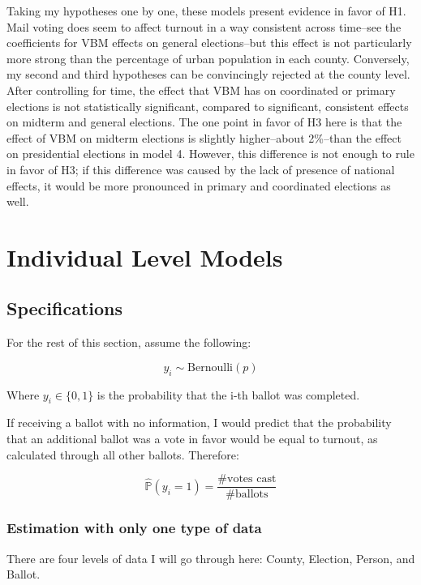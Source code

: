 \documentclass[12pt,twoside]{reedthesis}
\begin{document}
  Taking my hypotheses one by one, these models present evidence in favor
  of H1. Mail voting does seem to affect turnout in a way consistent
  across time--see the coefficients for VBM effects on general
  elections--but this effect is not particularly more strong than the
  percentage of urban population in each county. Conversely, my second and
  third hypotheses can be convincingly rejected at the county level. After
  controlling for time, the effect that VBM has on coordinated or primary
  elections is not statistically significant, compared to significant,
  consistent effects on midterm and general elections. The one point in
  favor of H3 here is that the effect of VBM on midterm elections is
  slightly higher--about 2\%--than the effect on presidential elections in
  model 4. However, this difference is not enough to rule in favor of H3;
  if this difference was caused by the lack of presence of national
  effects, it would be more pronounced in primary and coordinated
  elections as well.
  
  \section{Individual Level Models}\label{individual-level-models}
  
  \subsection{Specifications}\label{specifications-1}
  
  For the rest of this section, assume the following:
  
  \[y_i \sim \text{Bernoulli}(p)\]
  
  Where \(y_i \in \{0,1\}\) is the probability that the i-th ballot was
  completed.
  
  If receiving a ballot with no information, I would predict that the
  probability that an additional ballot was a vote in favor would be equal
  to turnout, as calculated through all other ballots. Therefore:
  
  \[\hat{\mathbb{P}}(y_i = 1) = \frac{\# \text{votes cast}}{\# \text{ballots}}\]
  
  \subsubsection{Estimation with only one type of
  data}\label{estimation-with-only-one-type-of-data}
  
  There are four levels of data I will go through here: County, Election,
  Person, and Ballot.
  
\end{document}
